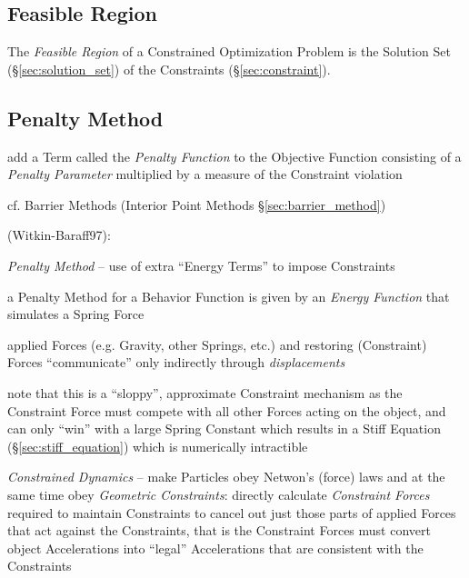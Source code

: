 \subsection{Feasible Region}\label{sec:feasible_region}

The \emph{Feasible Region} of a Constrained Optimization Problem is the
Solution Set (\S\ref{sec:solution_set}) of the Constraints
(\S\ref{sec:constraint}).



\subsection{Penalty Method}\label{sec:penalty_method}

add a Term called the \emph{Penalty Function} to the Objective Function
consisting of a \emph{Penalty Parameter} multiplied by a measure of the
Constraint violation

cf. Barrier Methods (Interior Point Methods \S\ref{sec:barrier_method})

(Witkin-Baraff97):

\emph{Penalty Method} -- use of extra ``Energy Terms'' to impose Constraints

a Penalty Method for a Behavior Function is given by an \emph{Energy Function}
that simulates a Spring Force

applied Forces (e.g. Gravity, other Springs, etc.) and restoring (Constraint)
Forces ``communicate'' only indirectly through \emph{displacements}

note that this is a ``sloppy'', approximate Constraint mechanism as the
Constraint Force must compete with all other Forces acting on the object, and
can only ``win'' with a large Spring Constant which results in a Stiff Equation
(\S\ref{sec:stiff_equation}) which is numerically intractible

\emph{Constrained Dynamics} -- make Particles obey Netwon's (force) laws and
at the same time obey \emph{Geometric Constraints}: directly calculate
\emph{Constraint Forces} required to maintain Constraints to cancel out just
those parts of applied Forces that act against the Constraints, that is the
Constraint Forces must convert object Accelerations into ``legal'' Accelerations
that are consistent with the Constraints



